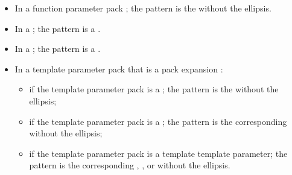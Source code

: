 \documentclass{wg21}
\begin{document}
\begin{itemize}
    \item In a function parameter pack ; the pattern is the
     without the ellipsis.

    \item In a  ;
    the pattern is a .

    \item In a  ;
    the pattern is a .

    \item In a template parameter pack that is a pack expansion :
    \begin{itemize}
    \item
    if the template parameter pack is a ;
    the pattern is the  without the ellipsis;

    \item
    if the template parameter pack is a ;
    the pattern is the corresponding 
    without the ellipsis;

    \item
    if the template parameter pack is a template template parameter;
    the pattern is the corresponding
    ,
    , or
    without the ellipsis.
   \end{itemize}
\end{itemize}


\ednote{[...]}
\end{document}
